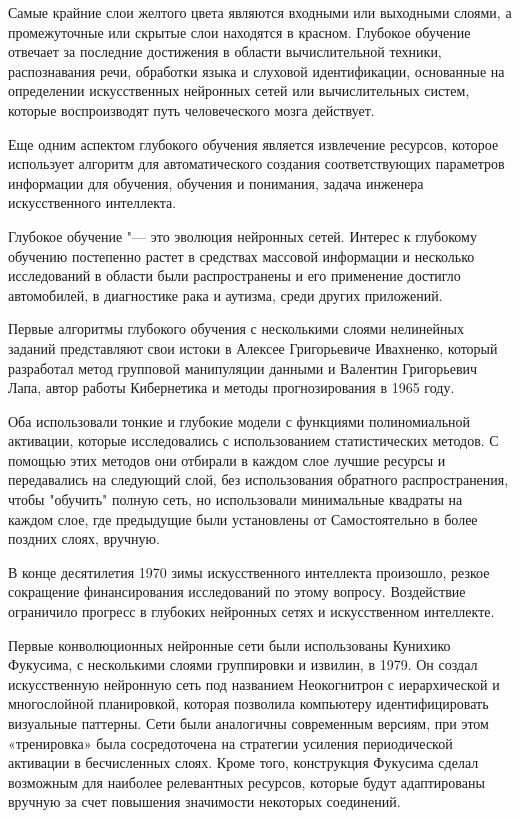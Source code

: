 
Самые крайние слои желтого цвета являются входными или выходными слоями,
а промежуточные или скрытые слои находятся в красном.
Глубокое обучение отвечает за последние достижения в области вычислительной техники,
распознавания речи, обработки языка и слуховой идентификации,
основанные на определении искусственных нейронных сетей или вычислительных систем,
которые воспроизводят путь человеческого мозга действует.

Еще одним аспектом глубокого обучения является извлечение ресурсов,
которое использует алгоритм для автоматического создания соответствующих параметров информации для обучения,
обучения и понимания, задача инженера искусственного интеллекта.

Глубокое обучение "--- это эволюция нейронных сетей.
Интерес к глубокому обучению постепенно растет в средствах массовой
информации и несколько исследований в области были распространены и
его применение достигло автомобилей, в диагностике рака и аутизма,
среди других приложений.

Первые алгоритмы глубокого обучения с несколькими слоями нелинейных заданий представляют свои истоки в Алексее Григорьевиче Ивахненко,
который разработал метод групповой манипуляции данными и Валентин Григорьевич Лапа,
автор работы Кибернетика и методы прогнозирования в 1965 году.

Оба использовали тонкие и глубокие модели с функциями полиномиальной активации,
которые исследовались с использованием статистических методов.
С помощью этих методов они отбирали в каждом слое лучшие ресурсы и передавались на следующий слой,
без использования обратного распространения, чтобы "обучить" полную сеть,
но использовали минимальные квадраты на каждом слое,
где предыдущие были установлены от Самостоятельно в более поздних слоях, вручную.


В конце десятилетия 1970 зимы искусственного интеллекта произошло,
резкое сокращение финансирования исследований по этому вопросу.
Воздействие ограничило прогресс в глубоких нейронных сетях и искусственном интеллекте.

Первые конволюционных нейронные сети были использованы Кунихико Фукусима,
с несколькими слоями группировки и извилин, в 1979.
Он создал искусственную нейронную сеть под названием Неокогнитрон 
с иерархической и многослойной планировкой,
которая позволила компьютеру идентифицировать визуальные паттерны.
Сети были аналогичны современным версиям, при этом «тренировка» была сосредоточена на стратегии усиления периодической активации в бесчисленных слоях.
Кроме того, конструкция Фукусима сделал возможным для наиболее релевантных ресурсов,
которые будут адаптированы вручную за счет повышения значимости некоторых соединений.

